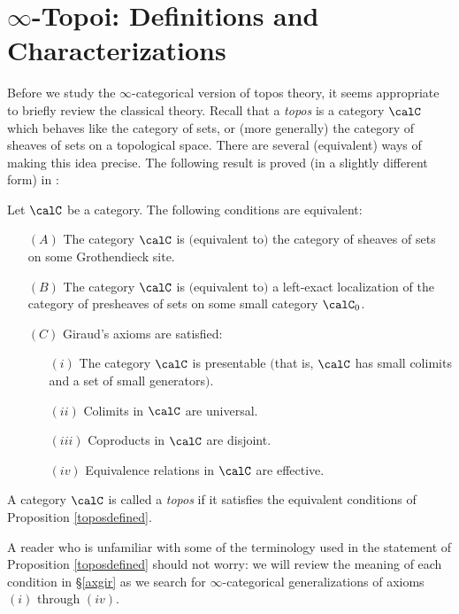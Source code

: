 \section{$\infty$-Topoi: Definitions and Characterizations}\label{chap6sec1}
 
\setcounter{theorem}{0}


Before we study the $\infty$-categorical version of topos theory, it seems appropriate to briefly review the classical theory. Recall that a {\it topos} is a category $\calC$ which behaves like the category of sets, or (more generally) the category of sheaves of sets on a topological space. There are several (equivalent) ways of making this idea precise. The following result is proved (in a slightly different form) in \cite{SGA}:

\begin{proposition}\label{toposdefined}
Let $\calC$ be a category. The following conditions are equivalent:
\begin{itemize}
\item[$(A)$] The category $\calC$ is $($equivalent to$)$ the category of
sheaves of sets on some Grothendieck site. \item[$(B)$] The category $\calC$ is
$($equivalent to$)$ a left-exact localization of the category of presheaves of sets
on some small category $\calC_0$. \item[$(C)$] Giraud's axioms are satisfied: \begin{itemize}
\item[$(i)$] The category $\calC$ is presentable $($that is, $\calC$ has small colimits and a set of small generators$)$.
\item[$(ii)$] Colimits in $\calC$ are universal. 
\item[$(iii)$] Coproducts in $\calC$ are disjoint. 
\item[$(iv)$] Equivalence relations in $\calC$ are effective.
\end{itemize}
\end{itemize}
\end{proposition}

\begin{definition}\label{def1topos}
A category $\calC$ is called a {\it topos} if it satisfies the equivalent conditions of
Proposition \ref{toposdefined}.
\end{definition}

\begin{remark}
A reader who is unfamiliar with some of the terminology used in the statement of Proposition \ref{toposdefined} should not worry: we will review the meaning of each condition in \S \ref{axgir} as we search for $\infty$-categorical generalizations of axioms $(i)$ through $(iv)$.
\end{remark}

